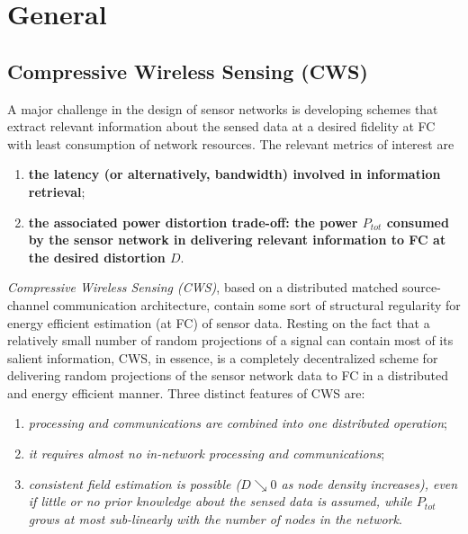 \chapter{General}
\label{CWS}
\section{Compressive Wireless Sensing (CWS)}
\label{sec1.1}
A major challenge in the design of sensor networks is developing \textcolor[rgb]{1,0,0}{schemes that extract relevant information about the sensed data} at a desired fidelity at FC with \textcolor[rgb]{1,0,0}{least consumption of network resources}. The relevant metrics of interest are
\begin{enumerate}
    \item \textbf{\textcolor[rgb]{1,0,0}{the latency (or alternatively, bandwidth) involved in information retrieval}};
    \item \textbf{\textcolor[rgb]{1,0,0}{the associated power distortion trade-off: the power $P_{tot}$ consumed by the sensor network in delivering relevant information to FC at the desired distortion $D$}}.
\end{enumerate}

\emph{\textcolor[rgb]{1,0,0}{Compressive Wireless Sensing (CWS)}}, based on a distributed matched source-channel communication architecture, contain some sort of structural regularity for energy efficient estimation (at FC) of sensor data. Resting on the fact that a relatively small number of random projections of a signal can contain most of its salient information, CWS, in essence, is a completely decentralized scheme for delivering random projections of the sensor network data to FC in a distributed and energy efficient manner. Three distinct features of CWS are:
\begin{enumerate}
    \item \emph{\textcolor[rgb]{1,0,0}{processing and communications are combined into one distributed operation}};
    \item \emph{\textcolor[rgb]{1,0,0}{it requires almost no in-network processing and communications}};
    \item \emph{\textcolor[rgb]{1,0,0}{consistent field estimation is possible ($D\searrow0$ as node density increases), even if little or no prior knowledge about the sensed data is assumed, while $P_{tot}$ grows at most sub-linearly with the number of nodes in the network}}.
\end{enumerate}

